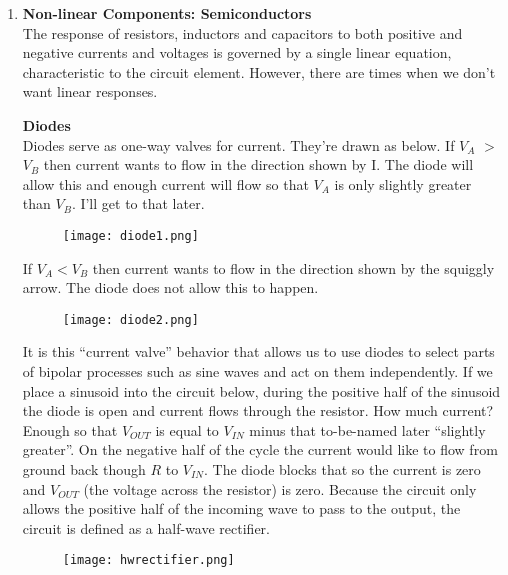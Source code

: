 \documentclass[12pt]{article}
\begin{document}
\begin{enumerate}[1.]
\item{\bf Non-linear Components: Semiconductors}\\
The response of resistors, inductors and capacitors to both positive and negative currents and voltages is governed by a single linear equation, 
characteristic to the circuit element. 
However, there are times when we don't want linear responses.

{\bf Diodes}\\
Diodes serve as one-way valves for current. 
They're drawn as below. If $V_A$ $>$ $V_B$ then current wants 
to flow in the direction shown by I. 
The diode will allow this and enough current will flow so that $V_A$ is only slightly greater than $V_B$.
I'll get to that later.
\begin{figure}[!ht]
\begin{center}
\texttt{[image: diode1.png]}
\end{center}
\end{figure}
\par If $V_A < V_B$ then current wants to flow in the direction shown by the squiggly arrow. 
The diode does not allow this to happen.
\begin{figure}[!ht]
\begin{center}
\texttt{[image: diode2.png]}
\end{center}
\end{figure}
\par It is this ``current valve'' behavior that allows us to use diodes to select parts of bipolar processes such as sine waves and act on them independently. 
If we place a sinusoid into the circuit below, during the positive half of the sinusoid the diode is open and current flows through the resistor. 
How much current? 
Enough so that $V_{OUT}$ is equal to $V_{IN}$ minus that to-be-named later ``slightly greater''.
On the negative half of the cycle the current would like to flow from ground back though $R$ to $V_{IN}$. 
The diode blocks that so the current is zero and $V_{OUT}$ (the voltage across the resistor) is zero.
Because the circuit only allows the positive half of the incoming wave to pass to the output, the circuit is defined as a half-wave rectifier.
\begin{figure}[!ht]
\begin{center}
\texttt{[image: hwrectifier.png]}

\end{center}
\end{figure}
\end{enumerate}
\end{document}
